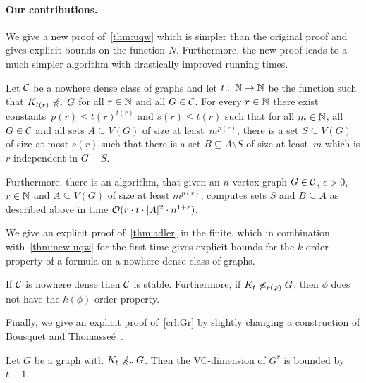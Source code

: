\paragraph{Our contributions.}

We give a new proof of~\cref{thm:uqw} which is simpler than 
the original proof and gives explicit bounds on the function $N$. 
Furthermore, the new proof leads to a much simpler algorithm 
with drastically improved running times.

\begin{theorem}\label{thm:new-uqw}
  Let $\mathcal{C}$ be a nowhere dense class of graphs and let 
  $t\,\colon\,\mathbb{N}\rightarrow \mathbb{N}$ be the function such that
  $K_{t(r)}\not\preccurlyeq_r G$ for all $r\in \mathbb{N}$ and all $G\in \mathcal{C}$.  
  For every $r\in \mathbb{N}$
  there exist constants~$p(r)\leq t(r)^{t(r)}$ and $s(r)\leq t(r)$ such that
  for all $m\in \mathbb{N}$, all $G\in\mathcal{C}$ and all sets $A\subseteq V(G)$ of size at 
  least~$m^{p(r)}$, there is a set $S\subseteq V(G)$ of size at
  most $s(r)$ such that there is a set $B\subseteq A\setminus S$ of size at
  least~$m$ which is $r$-independent in $G-S$.
  
  Furthermore, there is an algorithm, that given an $n$-vertex graph
  $G\in \mathcal{C}$, $\epsilon>0$, $r\in \mathbb{N}$ and $A\subseteq V(G)$ of size at least
  $m^{p(r)}$, computes sets $S$ and $B\subseteq A$ as described above
  in
  time $\mathcal{O}(r\cdot t\cdot |A|^2\cdot n^{1+\varepsilon})$.
\end{theorem}

We give an explicit proof of~\cref{thm:adler} in the finite, 
which in combination with~\cref{thm:new-uqw} for the first time
gives explicit bounds for the $k$-order property of a formula
on a nowhere dense class of graphs. 

\begin{theorem}\label{thm:new-stable}
If $\mathcal{C}$ is nowhere dense then $\mathcal{C}$ is stable. Furthermore, 
if $K_t\not\preccurlyeq_{r(\varphi)} G$, then $\phi$ does not have
the $k(\phi)$-order property.
\end{theorem}

Finally, we give an explicit proof of~\cref{crl:Gr} by slightly
changing a construction of Bousquet and 
Thomasse\'e~\cite{BousquetT15}. 

\begin{theorem}\label{thm:new-vc}
Let $G$ be a graph with $K_t\not\preccurlyeq_r G$. Then 
the VC-dimension of $G^r$ is
bounded by $t-1$. 
\end{theorem}